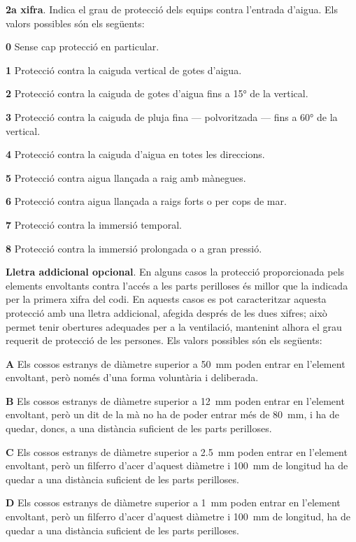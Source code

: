 \textbf{2a xifra}. Indica el grau de protecció dels equips contra
l'entrada d'aigua. Els valors possibles són els següents:
\begin{list}{}
   {\setlength{\labelwidth}{10mm} \setlength{\leftmargin}{10mm} \setlength{\labelsep}{2mm}}
   \item[\textbf{0}] Sense cap protecció en particular.
   \item[\textbf{1}] Protecció contra la caiguda vertical de gotes d'aigua.
   \item[\textbf{2}] Protecció contra la caiguda de gotes d'aigua fins a \ang{15} de la  vertical.
   \item[\textbf{3}] Protecció contra la caiguda de pluja fina --- polvoritzada --- fins a \ang{60} de la  vertical.
   \item[\textbf{4}] Protecció contra la caiguda d'aigua en totes les direccions.
   \item[\textbf{5}] Protecció contra aigua llançada a raig amb mànegues.
   \item[\textbf{6}] Protecció contra aigua llançada a raigs forts o per cops de mar.
   \item[\textbf{7}] Protecció contra la immersió temporal.
   \item[\textbf{8}] Protecció contra la immersió prolongada o a gran pressió.
\end{list}


\textbf{Lletra addicional opcional}. En alguns casos la protecció
proporcionada pels elements envoltants contra l'accés a les parts
perilloses és millor que la indicada per la primera xifra del codi.
En aquests casos es pot caracteritzar aquesta protecció amb una
lletra addicional, afegida després de les dues xifres; això permet
tenir obertures adequades per a la ventilació,  mantenint alhora el
grau requerit de protecció de les persones. Els valors possibles són
els següents:
\begin{list}{}
   {\setlength{\labelwidth}{10mm} \setlength{\leftmargin}{10mm} \setlength{\labelsep}{2mm}}
   \item[\textbf{A}] Els  cossos estranys de diàmetre superior a
   \qty{50}{mm}    poden entrar en l'element envoltant, però només d'una forma voluntària i deliberada.
   \item[\textbf{B}] Els  cossos estranys de diàmetre superior a \qty{12}{mm}
    poden entrar en l'element envoltant, però un dit de la mà no ha de poder entrar més de \qty{80}{mm}, i
    ha de quedar, doncs, a una distància    suficient de les parts perilloses.
   \item[\textbf{C}] Els  cossos estranys de diàmetre superior a \qty{2,5}{mm}
   poden entrar en l'element envoltant, però un filferro d'acer d'aquest diàmetre i \qty{100}{mm}
   de longitud ha de quedar a una distància suficient de les parts perilloses.
   \item[\textbf{D}] Els  cossos estranys de diàmetre superior a \qty{1}{mm}
   poden entrar en l'element envoltant, però un filferro d'acer d'aquest diàmetre i \qty{100}{mm}
   de longitud, ha de quedar a una distància suficient de les parts perilloses.
\end{list}

